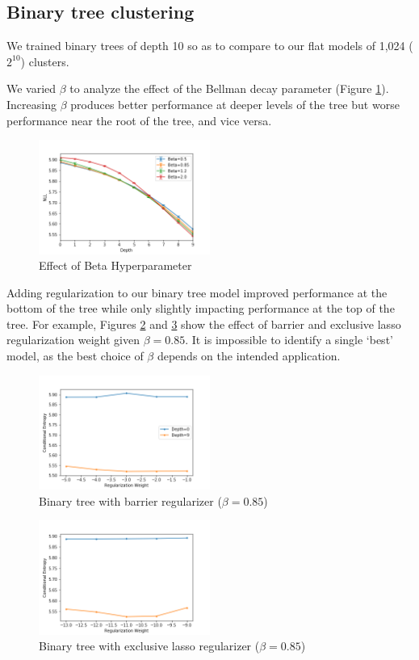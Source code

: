 \documentclass[11pt,letterpaper]{article}
\begin{document}
\subsection{Binary tree clustering}

We trained binary trees of depth 10 so as to compare to our flat models of 1,024 ($2^{10}$) clusters.

We varied $\beta$ to analyze the effect of the Bellman decay parameter (Figure \ref{f:beta}). Increasing $\beta$ produces better performance at deeper levels of the tree but worse performance near the root of the tree, and vice versa.

\begin{figure}
  \caption{Effect of Beta Hyperparameter}
\label{f:beta}
  \centering
    \includegraphics[width=0.5\textwidth]{skipgram_tree.png}
\end{figure}

Adding regularization to our binary tree model improved performance at the bottom of the tree while only slightly impacting performance at the top of the tree. For example, Figures \ref{f:btb} and \ref{f:btel} show the effect of barrier and exclusive lasso regularization weight given $\beta=0.85$. It is impossible to identify a single `best' model, as the best choice of $\beta$ depends on the intended application.

\begin{figure}
  \caption{Binary tree with barrier regularizer ($\beta=0.85$)}
\label{f:btb}
  \centering
    \includegraphics[width=0.5\textwidth]{skipgram_tree_b_0.png}
\end{figure}
\begin{figure}
  \caption{Binary tree with exclusive lasso regularizer ($\beta=0.85$)}
\label{f:btel}
  \centering
    \includegraphics[width=0.5\textwidth]{skipgram_tree_el_0.png}
\end{figure}
\end{document}
